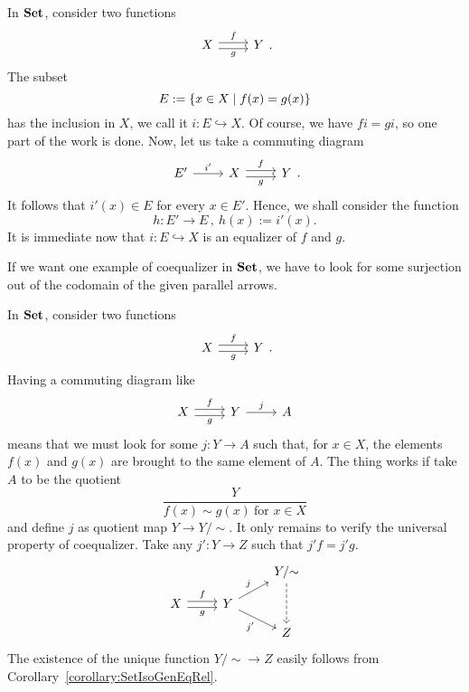 \begin{example}
In \(\mathbf{Set}\), consider two functions
\[\begin{tikzcd}
  X \ar["f", r, shift left] \ar["g", r, shift right, swap] & Y
\end{tikzcd} .\]
The subset
\[E := \left\{x \in X \mid f(x) = g(x)\right\}\]
has the inclusion in \(X\), we call it \(i : E \hookrightarrow X\). Of course, we have \(fi = gi\), so one part of the work is done. Now, let us take a commuting diagram
\[\begin{tikzcd}
E' \ar["{i'}", r] & X \ar["f", r, shift left] \ar["g", r, shift right, swap] & Y
\end{tikzcd} .\]
It follows that \(i'(x) \in E\) for every \(x \in E'\). Hence, we shall consider the function
\[h : E' \to E\,, \ h(x) := i'(x) .\]
It is immediate now that \(i : E \hookrightarrow X\) is an equalizer of \(f\) and \(g\).
\end{example}

If we want one example of coequalizer in \(\mathbf{Set}\), we have to look for some surjection out of the codomain of the given parallel arrows. 

\begin{example}
In \(\mathbf{Set}\), consider two functions
\[\begin{tikzcd}
X \ar["f", r, shift left] \ar["g", r, shift right, swap] & Y
\end{tikzcd} .\]
Having a commuting diagram like
\[\begin{tikzcd}
X \ar["f", r, shift left] \ar["g", r, shift right, swap] & Y \ar["j", r] & A 
\end{tikzcd}\]
means that we must look for some \(j : Y \to A\) such that, for \(x \in X\), the elements \(f(x)\) and \(g(x)\) are brought to the same element of \(A\). The thing works if take \(A\) to be the quotient
\[\frac{Y}{f(x) \sim g(x) \ \text{for } x \in X}\]
and define \(j\) as quotient map \(Y \to Y{/}{\sim}\). It only remains to verify the universal property of coequalizer. Take any \(j' : Y \to Z\) such that \(j'f = j'g\).
\[\begin{tikzcd}[row sep=small]
& & Y{/}{\sim} \ar[dd, dashed] \\
X \ar["f", r, shift left] \ar["g", r, shift right, swap] & Y \ar["j", ur] \ar["{j'}", dr, swap] \\
& & Z
\end{tikzcd}\]
The existence of the unique function \(Y{/}{\sim} \to Z\) easily follows from Corollary~\ref{corollary:SetIsoGenEqRel}.
\end{example}

